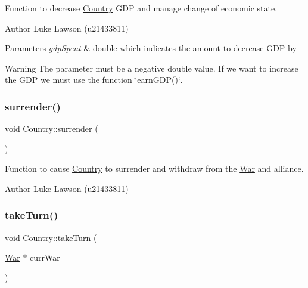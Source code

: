 Function to decrease \mbox{\hyperlink{class_country}{Country}} G\+DP and manage change of economic state. 

\begin{DoxyAuthor}{Author}
Luke Lawson (u21433811) 
\end{DoxyAuthor}

\begin{DoxyParams}{Parameters}
{\em gdp\+Spent} & double which indicates the amount to decrease G\+DP by \\
\hline
\end{DoxyParams}
\begin{DoxyWarning}{Warning}
The parameter must be a negative double value. If we want to increase the G\+DP we must use the function \char`\"{}earn\+G\+D\+P()\char`\"{}. 
\end{DoxyWarning}
\mbox{\label{class_country_ac3fe57380b664018f560b43b2f549193}} 
\subsubsection{\texorpdfstring{surrender()}{surrender()}}
{\footnotesize\ttfamily void Country\+::surrender (\begin{DoxyParamCaption}{ }\end{DoxyParamCaption})}



Function to cause \mbox{\hyperlink{class_country}{Country}} to surrender and withdraw from the \mbox{\hyperlink{class_war}{War}} and alliance. 

\begin{DoxyAuthor}{Author}
Luke Lawson (u21433811) 
\end{DoxyAuthor}
\mbox{\label{class_country_a4d6965d1a45f1d45f5af747f8225bd40}} 
\subsubsection{\texorpdfstring{takeTurn()}{takeTurn()}}
{\footnotesize\ttfamily void Country\+::take\+Turn (\begin{DoxyParamCaption}\item[{\mbox{\hyperlink{class_war}{War}} $\ast$}]{curr\+War }\end{DoxyParamCaption})}



